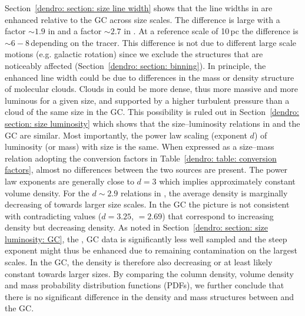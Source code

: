 Section~\ref{dendro: section: size line width} shows that the line widths in  are enhanced relative to the GC across size scales. The difference is large with a factor $\sim 1.9$ in  and a factor $\sim 2.7$ in . At a reference scale of 10\,pc the difference is $\sim 6-8$\,\kms depending on the tracer.
This difference is not due to different large scale motions (e.g. galactic rotation) 
since we exclude the structures that are noticeably affected (Section~\ref{dendro: section: binning}).
In principle, the enhanced line width could be due to differences in the mass or density structure of molecular clouds.
Clouds in  could be more dense, thus more massive and more luminous for a given size, and supported by a higher turbulent pressure than a cloud of the same size in the GC.
This possibility is ruled out in Section~\ref{dendro: section: size luminosity} which shows that the size--luminosity relations in  and the GC are similar. Most importantly, the power law scaling (exponent $d$) of luminosity (or mass) with size is the same. 
When expressed as a size--mass relation adopting the conversion factors in Table~\ref{dendro: table: conversion factors}, almost no differences between the two sources are present.
The power law exponents are generally close to $d=3$ which implies approximately constant volume density. 
For the $d\sim2.9$ relations in , the average density is marginally decreasing of towards larger size scales. In the GC the picture is not consistent with contradicting values ($d=3.25$, $=2.69$) that correspond to increasing  density but decreasing  density. As noted in Section~\ref{dendro: section: size luminosity: GC}, the , GC data is significantly less well sampled and the steep exponent might thus be enhanced due to remaining contamination on the largest scales. In the GC, the density is therefore also decreasing or at least likely constant towards larger sizes.
By comparing the column density, volume density and mass probability distribution functions (PDFs), we further conclude that there is no significant difference in the density and mass structures between  and the GC. 

